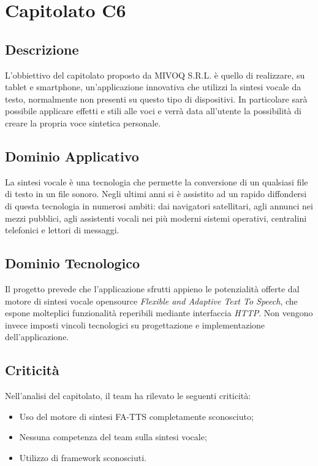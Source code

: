\newpage
\section{Capitolato C6}
\subsection{Descrizione}
L’obbiettivo del capitolato proposto da MIVOQ S.R.L. è quello di realizzare, su tablet e smartphone, un’applicazione innovativa che utilizzi la sintesi vocale da testo, normalmente non presenti su questo tipo di dispositivi. In particolare sarà possibile applicare effetti e stili alle voci e verrà data all’utente la possibilità di creare la propria voce sintetica personale.

\subsection{Dominio Applicativo}
La sintesi vocale è una tecnologia che permette la conversione di un qualsiasi file di testo in un file sonoro. Negli ultimi anni si è assistito ad un rapido diffondersi di questa tecnologia in numerosi ambiti: dai navigatori satellitari, agli annunci nei mezzi pubblici, agli assistenti vocali nei più moderni sistemi operativi, centralini telefonici e lettori di messaggi.

\subsection{Dominio Tecnologico}
Il progetto prevede che l’applicazione sfrutti appieno le potenzialità offerte dal motore di sintesi vocale opensource \textit{Flexible and Adaptive Text To Speech}, che espone molteplici funzionalità reperibili mediante interfaccia \textit{HTTP}. Non vengono invece imposti vincoli tecnologici su progettazione e implementazione dell’applicazione.

\subsection{Criticità}
Nell'analisi del capitolato, il team ha rilevato le seguenti criticità:
\begin{itemize}
\item Uso del motore di sintesi FA-TTS completamente sconosciuto;
\item Nessuna competenza del team sulla sintesi vocale;
\item Utilizzo di framework sconosciuti.
\end{itemize}

